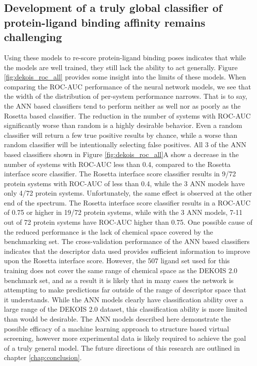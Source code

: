 \subsection{Development of a truly global classifier of protein-ligand binding affinity remains challenging}

Using these models to re-score protein-ligand binding poses indicates that while the models are well trained, they still lack the ability to act generally. Figure \ref{fig:dekois_roc_all} provides some insight into the limits of these models.
When comparing the ROC-AUC performance of the neural network models, we see that the width of the distribution of per-system performance narrows.
That is to say, the ANN based classifiers tend to perform neither as well nor as poorly as the Rosetta based classifier.
The reduction in the number of systems with ROC-AUC significantly worse than random is a highly desirable behavior.
Even a random classifier will return a few true positive results by chance, while a worse than random classifier will be intentionally selecting false positives.
All 3 of the ANN based classifiers shown in Figure \ref{fig:dekois_roc_all}A show a decrease in the number of systems with ROC-AUC less than 0.4, compared to the Rosetta interface score classifier.
The Rosetta interface score classifier results in 9/72 protein systems with ROC-AUC of less than 0.4, while the 3 ANN models have only 4/72 protein systems.
Unfortunately, the same effect is observed at the other end of the spectrum.
The Rosetta interface score classifier results in a ROC-AUC of 0.75 or higher in 19/72 protein systems, while with the 3 ANN models, 7-11 out of 72 protein systems have ROC-AUC higher than 0.75. 
One possible cause of the reduced performance is the lack of chemical space covered by the benchmarking set.
The cross-validation performance of the ANN based classifiers indicates that the descriptor data used provides sufficient information to improve upon the Rosetta interface score.
However, the 507 ligand set used for this training does not cover the same range of chemical space as the DEKOIS 2.0 benchmark set, and as a result it is likely that in many cases the network is attempting to make predictions far outside of the range of descriptor space that it understands.
While the ANN models clearly have classification ability over a large range of the DEKOIS 2.0 dataset, this classification ability is more limited than would be desirable.
The ANN models described here demonstrate the possible efficacy of a machine learning approach to structure based virtual screening, however more experimental data is likely required to achieve the goal of a truly general model.
The future directions of this research are outlined in chapter \ref{chap:conclusion}.